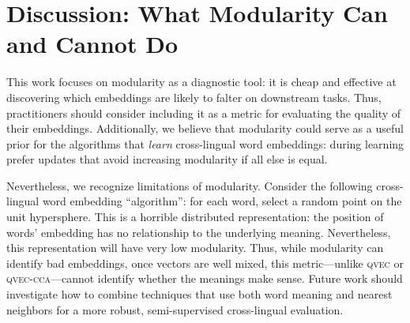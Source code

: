 \section{Discussion: What Modularity Can and Cannot Do}
\label{sec:conc}

This work focuses on modularity as a diagnostic tool: it is cheap and
effective at discovering which embeddings are likely to falter on
downstream tasks.  
Thus, practitioners should consider including it as a metric for
evaluating the quality of their embeddings.
Additionally, we believe that modularity could serve as a useful prior for the
algorithms that \emph{learn} cross-lingual word embeddings: during learning
prefer updates that avoid increasing modularity if all else is equal.

Nevertheless, we recognize limitations of modularity. 
Consider the following cross-lingual word embedding ``algorithm'': for
each word, select a random point on the unit hypersphere.
This is a horrible distributed representation: the position
of words' embedding has no relationship to the underlying meaning.
Nevertheless, this representation will have very low modularity.
Thus, while modularity can identify bad embeddings, once vectors are
well mixed, this metric---unlike \textsc{qvec} or \textsc{qvec-cca}---cannot identify whether the
meanings make sense.
Future work should investigate how to combine techniques that use both
word meaning and nearest neighbors for a more robust, semi-supervised
cross-lingual evaluation.

